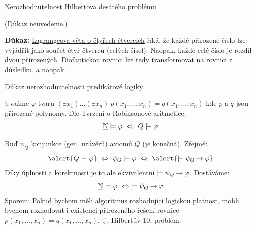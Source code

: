 \documentclass{beamer}
\begin{document}
\begin{frame}{Nerozhodnutelnost Hilbertova desátého problému}

    \pause

    (Důkaz neuvedeme.)

    \medskip

    \pause
    
    \pause
    \textbf{Důkaz:} \alert{\href{https://en.wikipedia.org/wiki/Lagrange\%27s_four-square_theorem}{Lagrangeova věta o čtyřech čtvercích}} říká, že každé přirozené číslo lze vyjádřit jako součet čtyř čtverců (celých čísel). Naopak, každé celé číslo je rozdíl dvou přirozených. Diofantickou rovnici lze tedy transformovat na rovnici z důsledku, a naopak.\hfill\qedsymbol

\end{frame}


\begin{frame}{Důkaz nerozhodnutelnosti predikátové logiky}

    \pause
    Uvažme $\varphi$ tvaru $(\exists x_1)\dots(\exists x_n)\ p(x_1,\dots,x_n)=q(x_1,\dots,x_n)$ 
    kde $p$ a $q$ jsou přirozené polynomy. Dle Tvrzení o Robinsonově aritmetice:
    $$
    \underline{\mathbb N}\models \varphi\ \Leftrightarrow\  Q\proves \varphi
    $$

    \pause
    Buď $\psi_Q$ konjunkce (gen. uzávěrů) axiomů $Q$ (je konečná). Zřejmě: 
    $$
    \alert{Q\proves\varphi}\ \Leftrightarrow\ \psi_Q\proves\varphi\ \Leftrightarrow\ \alert{\proves\psi_Q\limplies\varphi}
    $$
    \pause
    Díky úplnosti a korektnosti je to ale ekvivalentní \alert{$\models\psi_Q\mathbin{\rightarrow}\varphi$}. Dostáváme:
    $$
    \underline{\mathbb N}\models \varphi\ \Leftrightarrow\ \models \psi_Q\mathbin{\rightarrow}\varphi
    $$
    \pause
    \alert{Sporem:} Pokud bychom měli algoritmus rozhodující logickou platnost, mohli bychom rozhodovat i existenci přirozeného řešení rovnice $p(x_1,\dots,x_n)=q(x_1,\dots,x_n)$, tj. Hilbertův 10. problém.\hfill\qedsymbol

\end{frame}
\end{document}
